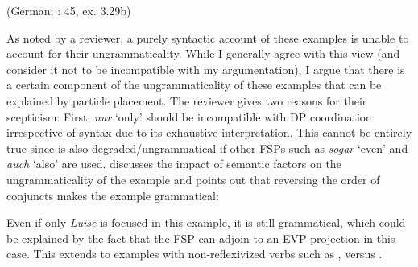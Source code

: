 \documentclass[output=paper,colorlinks,citecolor=brown]{langscibook}
\begin{document}
\label{Jacobs:basic1} \hfill (German; \citealt{Jacobs1983}: 45, ex. 3.29b)
\z

\noindent As noted by a reviewer, a purely syntactic account of these examples is unable to account for their ungrammaticality. While I generally agree with this view (and consider it not to be incompatible with my argumentation), I argue that there is a certain component of the ungrammaticality of these examples that can be explained by particle placement. The reviewer gives two reasons for their scepticism: First, \textit{nur} `only' should be incompatible with DP coordination irrespective of syntax due to its exhaustive interpretation. This cannot be entirely true since  is also degraded/ungrammatical if other FSPs such as \textit{sogar} `even' and \textit{auch} `also' are used. \citet[45]{Jacobs1983} discusses the impact of semantic factors on the ungrammaticality of the example and points out that reversing the order of conjuncts makes the example grammatical: 

\z

\noindent Even if only \textit{Luise} is focused in this example, it is still grammatical, which could be explained by the fact that the FSP can adjoin to an EVP-projection in this case. This extends to examples with non-reflexivized verbs such as , versus .

\ea\label{ex:jacobsfn2}
 \label{ex:jacobsfn2a}
\label{ex:jacobsfn2b}
\z 
\z 
\end{document}

